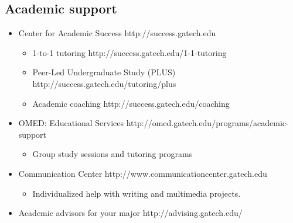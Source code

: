 \documentclass[11pt]{article}
\begin{document}
    \subsection{Academic support}
    \begin{itemize}
        \item Center for Academic Success http://success.gatech.edu
        \begin{itemize}
            \item 1-to-1 tutoring http://success.gatech.edu/1-1-tutoring
            \item Peer-Led Undergraduate Study (PLUS) http://success.gatech.edu/tutoring/plus
            \item Academic coaching http://success.gatech.edu/coaching
        \end{itemize}
        \item OMED: Educational Services http://omed.gatech.edu/programs/academic-support
        \begin{itemize}
            \item Group study sessions and tutoring programs
        \end{itemize}
        \item Communication Center http://www.communicationcenter.gatech.edu
        \begin{itemize}
            \item Individualized help with writing and multimedia projects.
        \end{itemize}
        \item Academic advisors for your major http://advising.gatech.edu/
    \end{itemize}
    
\end{document}
